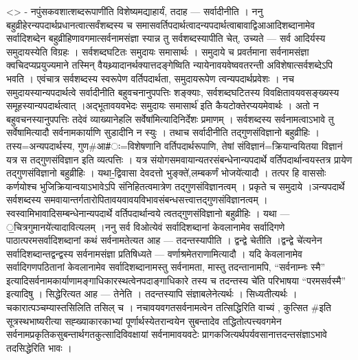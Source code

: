 \textless{}\textgreater{} - नपुंसकवशात्शब्दरूपाणी॑ति विशेष्यमद्याहार्यं,
तदाह --- सर्वादीनीति । ननु बहुव्रीहेरन्यपदार्थप्रधानत्वात्सर्वंशब्दस्य च
समासवर्तिपदार्थत्वादन्यपदार्थत्वाबावाद्विआआदिशब्दानामेव सर्वादिशब्देन
बहुव्रीहिणावगमात्सर्वनामसंज्ञा स्यान्न तु सर्वशब्दस्यापीति चेत्, उच्यते
--- सर्व आदिर्यस्य समुदायस्येति विग्रहः । सर्वशब्दघटितः समुदायः
समासार्थः । समुदाये च प्रवर्तमाना सर्वनामसंज्ञा क्वचिदप्यप्रयुज्यमाने
तस्मिन् वैयथ्र्यादानर्थक्यात्तदङ्गेष्विति न्यायेनावयवेष्ववतरन्ती
अविशेषात्सर्वशब्देऽपि भवति । एवंचात्र सर्वशब्दस्य स्वरूपेण
वर्तिपदार्थता, समुदायरूपेण त्वन्यपदार्थप्रवेशः । नच
समुदायस्यान्यपदार्थत्वे सर्वादीनीति बहुवचनानुपपत्तिः शङ्क्याः,
सर्वशब्दघटितस्य विवक्षितावयवसङ्ख्यस्य समूहस्यान्यपदार्थत्वात्
।अद्भूतावयवभेदः समुदायः समासार्थ॑ इति कैयटोक्तेरप्ययमेवार्थः । अतो न
बहुवचनस्यानुपपत्तिः तदेवं व्याख्यानेहलि सर्वेषा॑मित्यादिनिर्देशः
प्रमाणम् । सर्वशब्दस्य सर्वनामत्वाऽभावे तु सर्वेषामित्यादौ
सर्वनामकार्याणि सुडादीनि न स्युः । तथाच सर्वादीनीति तद्गुणसंविज्ञानो
बहुव्रीहिः । तस्य=अन्यपदार्थस्य, गुण\#आ\#ः=विशेषणानि वर्तिपदार्थरूपाणि,
तेषां संविज्ञानं=क्रियान्वयितया विज्ञानं यत्र स तद्गुणसंविज्ञान इति
व्यत्पत्तिः । यत्र संयोगसमवायान्यतरसंबन्धेनान्यपदार्थे
वर्तिपदार्थान्वयस्तत्र प्रायेण तद्गुणसंविज्ञानो बहुव्रीहिः ।
यथा-॒द्विवासा देवदत्तो भुङ्क्ते॑,लम्बकर्णं भोजये॑त्यादौ । तत्पर हि
वाससोः कर्णयोश्च भुजिक्रियान्वयाऽभावेऽपि संनिहितत्वमात्रेण
तद्गुणसंविज्ञानत्वम् । प्रकृते च समुदाये ।ञन्यपदार्थे सर्वशब्दस्य
समवायान्तर्गतारोपितावयवावयविभावसंबन्धसत्त्वात्तद्गुणसंविज्ञानत्वम् ।
स्वस्वामिभावादिसम्बन्धेनान्यपदार्थे वर्तिपदार्थान्वये
त्वतद्गुणसंविज्ञानो बहुव्रीहिः । यथा --- ॒चित्रगुमानये॑त्यादावित्यलम्
।ननु सर्व विओत्येवं सर्वादिशब्दानां केवलानामेव सर्वादिगणे
पाठात्परमसर्वादिशब्दानां कथं सर्वनामतेत्यत आह --- तदन्तस्यापीति ।
द्वन्द्वे चेतीति ।द्वन्द्वे चे॑त्यनेन सर्वादिशब्दान्तद्वन्द्वस्य
सर्वनामसंज्ञा प्रतिषिध्यते --- वर्णाश्रमेतराणामित्यादौ । यदि केवलानामेव
सर्वादिगणपठितानां केवलानामेव सर्वादिशब्दानामस्तु सर्वनामता, मास्तु
तदन्तानामपि, ``सर्वनाम्नः स्मै''
इत्यादिसर्वनामकार्याणामङ्गाधिकारस्थत्वेनपदाङ्गाधिकारे तस्य च तदन्तस्य
चे॑ति परिभाषया ``परमसर्वस्मै'' इत्यादिषु । सिद्धेरित्यत आह --- तेनेति ।
तदन्तस्यापि संज्ञाबलेनेत्यर्थः । सिध्यतीत्यर्थः ।
चकारात्पञ्चम्यास्तसिलिति तसिल् च । नचावयवगतसर्वनामत्वेन तत्सिद्धिरिति
वाच्यं , कुत्सित \#इति सूत्रस्थभाष्यरीत्या सह्ख्याकारकाभ्यां
पूर्णार्थस्येतरान्वयेन सुबन्तादेव तद्धितोत्पत्त्यवगमेन
सर्वनामप्रकृतिकसुबन्तार्थगतकुत्सादिविवक्षायां सर्वनामावयवटेः
प्रागकजित्यर्थपर्यवसानात्तदन्तसंज्ञाऽभावे तदसिद्धेरिति भावः ।
